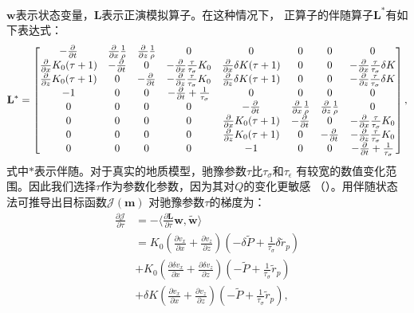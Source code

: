 $\mathbf{w}$表示状态变量，$\mathbf{L}$表示正演模拟算子。在这种情况下，
正算子的伴随算子$\mathbf{L}^\ast$有如下表达式：
    \begin{eqnarray*}
        \mathbf{L}^\ast =  
        \begin{bmatrix}
            -\frac{\partial}{\partial t} &\frac{\partial}{\partial x}\frac{1}{\rho}
            &\frac{\partial}{\partial z}\frac{1}{\rho} &0 &0 &0 &0 &0\cr
            \frac{\partial}{\partial x}K_0(\tau +1) &-\frac{\partial}{\partial t} &0 
            &-\frac{\partial}{\partial x}\frac{\tau}{\tau_\sigma}K_0
            &\frac{\partial}{\partial x}\delta K(\tau+1) &0 &0
            &-\frac{\partial}{\partial x}\frac{\tau}{\tau_\sigma}\delta K \cr
            \frac{\partial}{\partial z}K_0(\tau +1) &0 &-\frac{\partial}{\partial t} 
            &-\frac{\partial}{\partial z}\frac{\tau}{\tau_\sigma}K_0
            &\frac{\partial}{\partial z}\delta K(\tau+1) &0 &0
            &-\frac{\partial}{\partial z}\frac{\tau}{\tau_\sigma}\delta K \cr
            -1 &0 &0 &-\frac{\partial}{\partial t}+\frac{1}{\tau_\sigma} &0 &0 &0 &0\cr
            0 &0 &0 &0 &-\frac{\partial}{\partial t} &\frac{\partial}{\partial
            x}\frac{1}{\rho} &\frac{\partial}{\partial z}\frac{1}{\rho} &0\cr
            0 &0 &0 &0 &\frac{\partial}{\partial x}K_0(\tau +1)
            &-\frac{\partial}{\partial t} &0 &-\frac{\partial}{\partial
            x}\frac{\tau}{\tau_\sigma}K_0 \cr
            0 &0 &0 &0 &\frac{\partial}{\partial z}K_0(\tau +1) &0
            &-\frac{\partial}{\partial t} &-\frac{\partial}{\partial
        z}\frac{\tau}{\tau_\sigma}K_0 \cr
           0 &0 &0 &0 &-1 &0 &0 &-\frac{\partial}{\partial t}+\frac{1}{\tau_\sigma}
        \end{bmatrix},
    \end{eqnarray*}
式中$\ast$表示伴随。对于真实的地质模型，驰豫参数$\tau$比$\tau_\sigma$和$\tau_\epsilon$
有较宽的数值变化范围。因此我们选择$\tau$作为参数化参数，因为其对$Q$的变化更敏感
（）。用伴随状态法可推导出目标函数$\mathcal{J}(\mathbf{m})$
对驰豫参数$\tau$的梯度为：
   \begin{equation}
    \begin{aligned}
        \frac{\partial \mathcal{J}}{\partial \tau} &= -\langle\frac{\partial \mathbf{L}}{\partial\tau}
        \mathbf{w},\tilde{\mathbf{w}} \rangle \\
        &= {K_0(\frac{\partial v_x}{\partial
        x}+\frac{\partial v_z}{\partial
    z})(-\delta\tilde{P}+\frac{1}{\tau_\sigma}\delta\tilde{r}_p)} \\
    &{+K_0(\frac{\partial \delta v_x}{\partial x}+\frac{\partial \delta
        v_z}{\partial z})(-\tilde{P}+\frac{1}{\tau_\sigma}\tilde{r}_p)} \\
        &{+\delta K(\frac{\partial v_x}{\partial x}+\frac{\partial v_z}{\partial
        z})(-\tilde{P}+\frac{1}{\tau_\sigma}\tilde{r}_p)},
    \end{aligned}
    \label{eq:gradient}
    \end{equation}
